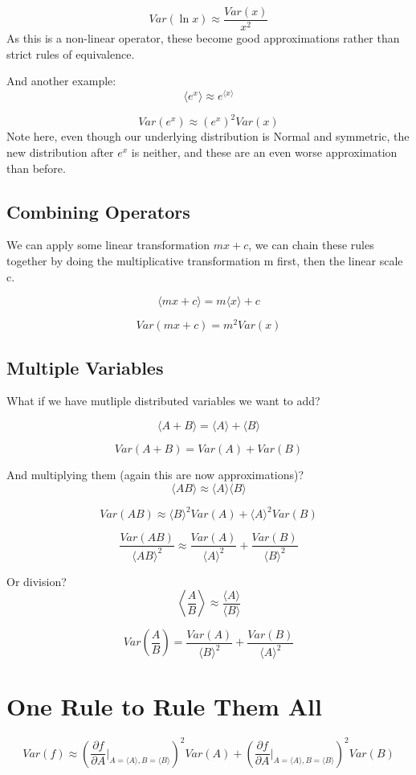 \[
    Var(\ln x) \approx \frac{Var(x)}{x^2}
\]
As this is a non-linear operator, these become good approximations rather than strict rules of equivalence.

And another example:
\[
    \langle e^x \rangle \approx e^{\langle x\rangle}
\]

\[
    Var(e^x) \approx (e^x)^2 Var(x)
\]
Note here, even though our underlying distribution is Normal and symmetric, the new distribution after $e^x$ is neither, and these are an even worse approximation than before.

\subsection*{Combining Operators}
We can apply some linear transformation $mx + c$, we can chain these rules together by doing the multiplicative transformation m first, then the linear scale c.

\[
    \langle mx + c\rangle = m \langle x \rangle + c
\]

\[
    Var(mx+c) = m^2 Var(x)
\]

\subsection*{Multiple Variables}
What if we have mutliple distributed variables we want to add?

\[
    \langle A+B\rangle = \langle A \rangle + \langle B\rangle
\]

\[
    Var(A+B) = Var(A) + Var(B)
\]

And multiplying them (again this are now approximations)?
\[
    \langle AB\rangle \approx \langle A\rangle \langle B\rangle
\]

\[
    Var(AB) \approx \langle B\rangle^2 Var(A) + \langle A\rangle^2 Var(B)
\]

\[
    \frac{Var(AB)}{\langle AB\rangle^2} \approx \frac{Var(A)}{\langle A\rangle^2} + \frac{Var(B)}{\langle B\rangle^2}
\]

Or division?
\[
    \left\langle \frac{A}{B}\right\rangle \approx \frac{\langle A\rangle}{\langle B\rangle}
\]

\[
    Var\left(\frac{A}{B}\right) = \frac{Var(A)}{\langle B\rangle^2} + \frac{Var(B)}{\langle A\rangle^2}
\]

\section*{One Rule to Rule Them All}
\[
    Var(f) \approx \left(\frac{\partial f}{\partial A} \Bigr\rvert_{A = \langle A\rangle, B = \langle B\rangle}\right)^2 Var(A) + \left(\frac{\partial f}{\partial A} \Bigr\rvert_{A = \langle A\rangle, B = \langle B\rangle}\right)^2 Var(B)
\]



